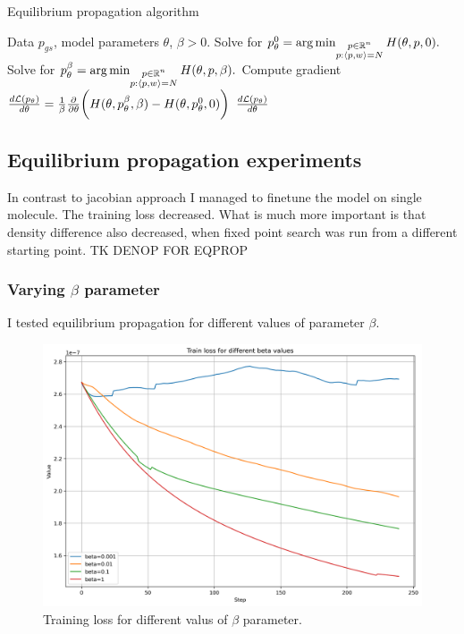 \documentclass[a4paper,10pt]{report}
\begin{document}
\begin{algorithm}[H]
\caption{Equilibrium propagation algorithm}
\begin{algorithmic}[1]
\Require Data $p_{gs}$, model parameters $\theta$, $\beta>0$.
\State  Solve for $p_\theta^0  = \operatorname*{arg\,min}_{\substack{p \in \mathbb{R}^n \\ p: \langle p, w \rangle=N }} H(\theta, p, 0).$
\State Solve for $p_\theta^\beta  = \operatorname*{arg\,min}_{\substack{p \in \mathbb{R}^n \\ p: \langle p, w \rangle=N }} H(\theta, p, \beta).$
\State Compute gradient $\frac{d\mathcal{L}(p_\theta)}{d \theta} = \frac{1}{\beta} \frac{\partial }{\partial \theta} \bigg(H(\theta, p_\theta^\beta,\beta) - H(\theta, p_\theta^0, 0)\bigg)$
\State \Return $\frac{d\mathcal{L}(p_\theta)}{d \theta}$
\end{algorithmic}
\end{algorithm}


\subsection{Equilibrium propagation experiments}
In contrast to jacobian approach I managed to finetune the model on single molecule.
The training loss decreased. What is much more important is that density difference also decreased, when fixed point search was run from a different starting point.
TK DENOP FOR EQPROP
\subsubsection{Varying $\beta$ parameter}
I tested equilibrium propagation for different values of parameter $\beta$.
\begin{figure}[h!]
 \centering
 \includegraphics[scale=0.5]{images/train_loss_betas.png}
 \caption{Training loss for different valus of $\beta$ parameter.}
 \label{fig:jac-eqprop-loss}
\end{figure}
\end{document}
